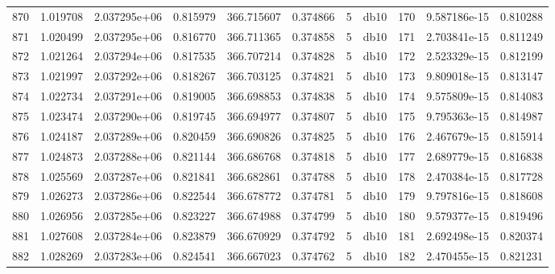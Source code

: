 \begin{tabular}{lrrrrrrlrrr}
870  &    1.019708 &        2.037295e+06 &  0.815979 &              366.715607 &    0.374866 &       5 &         db10 &    170 &   9.587186e-15 &      0.810288 \\
871  &    1.020499 &        2.037295e+06 &  0.816770 &              366.711365 &    0.374858 &       5 &         db10 &    171 &   2.703841e-15 &      0.811249 \\
872  &    1.021264 &        2.037294e+06 &  0.817535 &              366.707214 &    0.374828 &       5 &         db10 &    172 &   2.523329e-15 &      0.812199 \\
873  &    1.021997 &        2.037292e+06 &  0.818267 &              366.703125 &    0.374821 &       5 &         db10 &    173 &   9.809018e-15 &      0.813147 \\
874  &    1.022734 &        2.037291e+06 &  0.819005 &              366.698853 &    0.374838 &       5 &         db10 &    174 &   9.575809e-15 &      0.814083 \\
875  &    1.023474 &        2.037290e+06 &  0.819745 &              366.694977 &    0.374807 &       5 &         db10 &    175 &   9.795363e-15 &      0.814987 \\
876  &    1.024187 &        2.037289e+06 &  0.820459 &              366.690826 &    0.374825 &       5 &         db10 &    176 &   2.467679e-15 &      0.815914 \\
877  &    1.024873 &        2.037288e+06 &  0.821144 &              366.686768 &    0.374818 &       5 &         db10 &    177 &   2.689779e-15 &      0.816838 \\
878  &    1.025569 &        2.037287e+06 &  0.821841 &              366.682861 &    0.374788 &       5 &         db10 &    178 &   2.470384e-15 &      0.817728 \\
879  &    1.026273 &        2.037286e+06 &  0.822544 &              366.678772 &    0.374781 &       5 &         db10 &    179 &   9.797816e-15 &      0.818608 \\
880  &    1.026956 &        2.037285e+06 &  0.823227 &              366.674988 &    0.374799 &       5 &         db10 &    180 &   9.579377e-15 &      0.819496 \\
881  &    1.027608 &        2.037284e+06 &  0.823879 &              366.670929 &    0.374792 &       5 &         db10 &    181 &   2.692498e-15 &      0.820374 \\
882  &    1.028269 &        2.037283e+06 &  0.824541 &              366.667023 &    0.374762 &       5 &         db10 &    182 &   2.470455e-15 &      0.821231 \\

\end{tabular}
